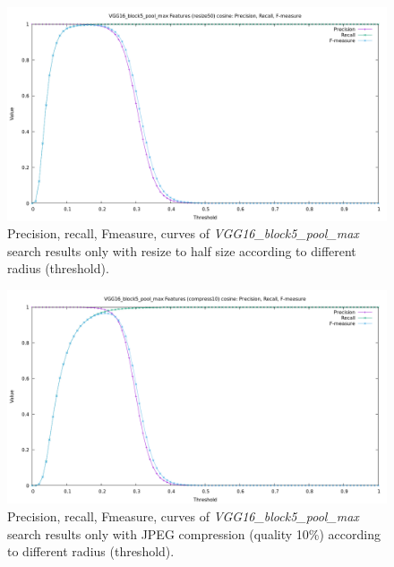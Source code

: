 \begin{figure}
	\centering
	\includegraphics[width=\textwidth]{img/benchmark_VGG16_block5_pool_max_cosine_resize50.png}
	\caption{Precision, recall, Fmeasure, curves of \textit{VGG16\_block5\_pool\_max} search results only with resize to half size according to different radius (threshold).}
	\label{fig:benchmark_VGG16_block5_pool_max_cosine_resize50}
\end{figure}

\begin{figure}
	\centering
	\includegraphics[width=\textwidth]{img/benchmark_VGG16_block5_pool_max_cosine_compress10.png}
	\caption{Precision, recall, Fmeasure, curves of \textit{VGG16\_block5\_pool\_max} search results only with JPEG compression (quality 10\%) according to different radius (threshold).}
	\label{fig:benchmark_VGG16_block5_pool_max_cosine_compress10}
\end{figure}

